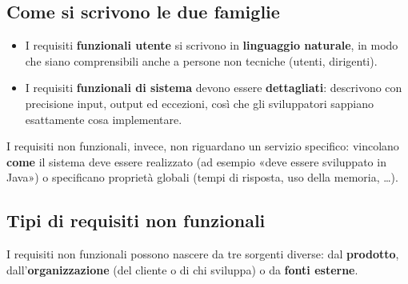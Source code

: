 \subsection{Come si scrivono le due famiglie}

\begin{itemize}
  \item I requisiti \textbf{funzionali utente} si scrivono in \textbf{linguaggio naturale}, in modo che siano comprensibili anche
        a persone non tecniche (utenti, dirigenti).
  \item I requisiti \textbf{funzionali di sistema} devono essere \textbf{dettagliati}: descrivono con precisione input, output
        ed eccezioni, così che gli sviluppatori sappiano esattamente cosa implementare.
\end{itemize}

I requisiti non funzionali, invece, non riguardano un servizio specifico: vincolano \textbf{come} il sistema deve essere realizzato
(ad esempio «deve essere sviluppato in Java») o specificano proprietà globali (tempi di risposta, uso della memoria, \ldots).


\subsection{Tipi di requisiti non funzionali}

I requisiti non funzionali possono nascere da tre sorgenti diverse: dal \textbf{prodotto}, dall'\textbf{organizzazione}
(del cliente o di chi sviluppa) o da \textbf{fonti esterne}.

